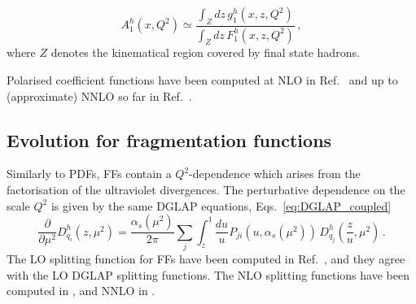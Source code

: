 \begin{equation}
  A_1^{h}(x,Q^2) \simeq  \frac{\int_{Z} dz \, g_1^h (x,z,Q^2)}{\int_{Z} dz \, F_1^h (x,z,Q^2)} \,,
\end{equation}
where $Z$ denotes the kinematical region covered by final state hadrons.\par
Polarised coefficient functions have been computed at NLO in Ref.~\cite{deFlorian:1997zj} and up to (approximate) NNLO so far in Ref.~\cite{Abele:2021nyo}.\par

\subsection*{Evolution for fragmentation functions}
Similarly to PDFs, FFs contain a $Q^2$-dependence which arises from the factorisation of the ultraviolet divergences. The perturbative dependence on the scale $Q^2$ is given by the same DGLAP equations, Eqs.~\eqref{eq:DGLAP_coupled}
\begin{equation}
  \frac{\partial}{\partial \mu^2} D_{q_i}^{h} (z,\mu^2) = \frac{\alpha_s(\mu^2)}{2\pi} \sum_{j} \int_{z}^{1} \frac{du}{u} P_{ji}\left( u, \alpha_s(\mu^2) \right) \, D_{q_j}^h \left( \frac{z}{u}, \mu^2 \right) \,.
\end{equation}
The LO splitting function for FFs have been computed in Ref.~\cite{Owens:1978qz, Uematsu:1978yw, Georgi:1977mg}, and they agree with the LO DGLAP splitting functions. The NLO splitting functions have been computed in \cite{Curci:1980uw, Furmanski:1980cm}, and NNLO in \cite{Mitov:2006ic, Moch:2007tx, Almasy:2011eq}.